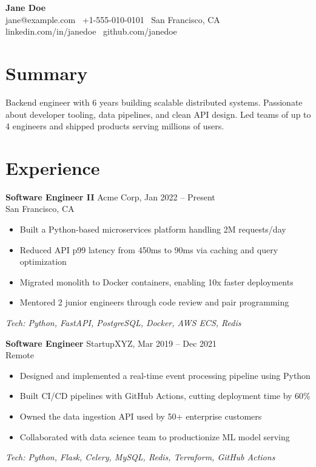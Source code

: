 \documentclass[10.5pt,letterpaper]{article}
\begin{document}
\begin{center}
  {\LARGE\textbf{Jane Doe}}\\[4pt]
  jane@example.com \textbar\ +1-555-010-0101 \textbar\ San Francisco, CA \\
  linkedin.com/in/janedoe \textbar\ github.com/janedoe
\end{center}

\section*{Summary}
Backend engineer with 6 years building scalable distributed systems. Passionate about
developer tooling, data pipelines, and clean API design. Led teams of up to 4 engineers
and shipped products serving millions of users.

\section*{Experience}

\textbf{Software Engineer II} \hfill Acme Corp, Jan 2022 -- Present\\
San Francisco, CA
\begin{itemize}
  \item Built a Python-based microservices platform handling 2M requests/day
  \item Reduced API p99 latency from 450ms to 90ms via caching and query optimization
  \item Migrated monolith to Docker containers, enabling 10x faster deployments
  \item Mentored 2 junior engineers through code review and pair programming
\end{itemize}
\textit{Tech: Python, FastAPI, PostgreSQL, Docker, AWS ECS, Redis}

\medskip
\textbf{Software Engineer} \hfill StartupXYZ, Mar 2019 -- Dec 2021\\
Remote
\begin{itemize}
  \item Designed and implemented a real-time event processing pipeline using Python
  \item Built CI/CD pipelines with GitHub Actions, cutting deployment time by 60\%
  \item Owned the data ingestion API used by 50+ enterprise customers
  \item Collaborated with data science team to productionize ML model serving
\end{itemize}
\textit{Tech: Python, Flask, Celery, MySQL, Redis, Terraform, GitHub Actions}
\end{document}
